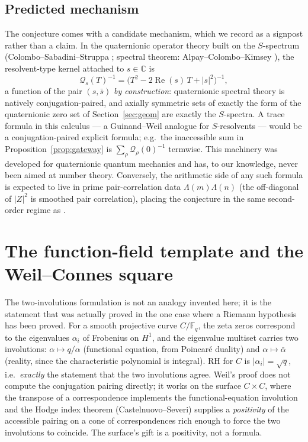 \documentclass[11pt]{amsart}
\theoremstyle{definition}
\theoremstyle{remark}
\newcommand{\CC}{\mathbb{C}}
\DeclareMathOperator{\Rre}{Re}
\begin{document}
\subsection*{Predicted mechanism}
The conjecture comes with a candidate mechanism, which we record as a signpost rather than a claim. In the quaternionic operator theory built on the $S$-spectrum (Colombo--Sabadini--Struppa \cite{CSSbook}; spectral theorem: Alpay--Colombo--Kimsey \cite{ACK}), the resolvent-type kernel attached to $s\in\CC$ is
\[
\mathcal Q_s(T)^{-1}=\big(T^2-2\Rre(s)\,T+|s|^2\big)^{-1},
\]
a function of the pair $(s,\bar s)$ \emph{by construction}: quaternionic spectral theory is natively conjugation-paired, and axially symmetric sets of exactly the form of the quaternionic zero set of Section~\ref{sec:geom} are exactly the $S$-spectra. A trace formula in this calculus --- a Guinand--Weil analogue for $S$-resolvents --- would be a conjugation-paired explicit formula; e.g.\ the inaccessible sum in Proposition~\ref{prop:gateway} is $\sum_\rho\mathcal Q_\rho(0)^{-1}$ termwise. This machinery was developed for quaternionic quantum mechanics and has, to our knowledge, never been aimed at number theory. Conversely, the arithmetic side of any such formula is expected to live in prime pair-correlation data $\Lambda(m)\Lambda(n)$ (the off-diagonal of $|Z|^2$ is smoothed pair correlation), placing the conjecture in the same second-order regime as \cite{Montgomery,GoldstonMontgomery,ConreyIwaniec}.

\section{The function-field template and the Weil--Connes square}\label{sec:weil}

The two-involutions formulation is not an analogy invented here; it is the statement that was actually proved in the one case where a Riemann hypothesis has been proved. For a smooth projective curve $C/\mathbb F_q$, the zeta zeros correspond to the eigenvalues $\alpha_i$ of Frobenius on $H^1$, and the eigenvalue multiset carries two involutions: $\alpha\mapsto q/\alpha$ (functional equation, from Poincar\'e duality) and $\alpha\mapsto\bar\alpha$ (reality, since the characteristic polynomial is integral). RH for $C$ is $|\alpha_i|=\sqrt q$, i.e.\ \emph{exactly} the statement that the two involutions agree. Weil's proof \cite{Weil1948} does not compute the conjugation pairing directly; it works on the surface $C\times C$, where the transpose of a correspondence implements the functional-equation involution and the Hodge index theorem (Castelnuovo--Severi) supplies a \emph{positivity} of the accessible pairing on a cone of correspondences rich enough to force the two involutions to coincide. The surface's gift is a positivity, not a formula.
\end{document}
